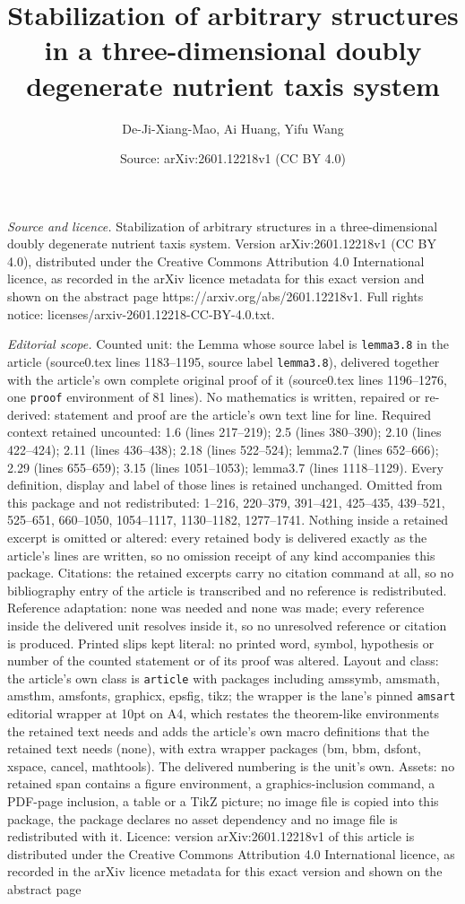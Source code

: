 \documentclass[10pt,a4paper]{amsart}
\title[Stabilization of arbitrary structures in a three-dimensional]{Stabilization of arbitrary structures in a three-dimensional doubly degenerate nutrient taxis system}
\author{De-Ji-Xiang-Mao, Ai Huang, Yifu Wang}
\date{Source: arXiv:2601.12218v1 (CC BY 4.0)}
\begin{document}
\maketitle

\noindent\emph{Source and licence.} Stabilization of arbitrary structures in a three-dimensional doubly degenerate nutrient taxis system. Version arXiv:2601.12218v1 (CC BY 4.0), distributed under the Creative Commons Attribution 4.0 International licence, as recorded in the arXiv licence metadata for this exact version and shown on the abstract page https://arxiv.org/abs/2601.12218v1. Full rights notice: licenses/arxiv-2601.12218-CC-BY-4.0.txt.\par\smallskip

\noindent\textit{Editorial scope.} Counted unit: the Lemma whose source label is \texttt{lemma3.8} in the article (source0.tex lines 1183--1195, source label \texttt{lemma3.8}), delivered together with the article's own complete original proof of it (source0.tex lines 1196--1276, one \texttt{proof} environment of 81 lines). No mathematics is written, repaired or re-derived: statement and proof are the article's own text line for line. Required context retained uncounted: 1.6 (lines 217--219); 2.5 (lines 380--390); 2.10 (lines 422--424); 2.11 (lines 436--438); 2.18 (lines 522--524); lemma2.7 (lines 652--666); 2.29 (lines 655--659); 3.15 (lines 1051--1053); lemma3.7 (lines 1118--1129). Every definition, display and label of those lines is retained unchanged. Omitted from this package and not redistributed: 1--216, 220--379, 391--421, 425--435, 439--521, 525--651, 660--1050, 1054--1117, 1130--1182, 1277--1741. Nothing inside a retained excerpt is omitted or altered: every retained body is delivered exactly as the article's lines are written, so no omission receipt of any kind accompanies this package. Citations: the retained excerpts carry no citation command at all, so no bibliography entry of the article is transcribed and no reference is redistributed. Reference adaptation: none was needed and none was made; every reference inside the delivered unit resolves inside it, so no unresolved reference or citation is produced. Printed slips kept literal: no printed word, symbol, hypothesis or number of the counted statement or of its proof was altered. Layout and class: the article's own class is \texttt{article} with packages including amssymb, amsmath, amsthm, amsfonts, graphicx, epsfig, tikz; the wrapper is the lane's pinned \texttt{amsart} editorial wrapper at 10pt on A4, which restates the theorem-like environments the retained text needs and adds the article's own macro definitions that the retained text needs (none), with extra wrapper packages (bm, bbm, dsfont, xspace, cancel, mathtools). The delivered numbering is the unit's own. Assets: no retained span contains a figure environment, a graphics-inclusion command, a PDF-page inclusion, a table or a TikZ picture; no image file is copied into this package, the package declares no asset dependency and no image file is redistributed with it. Licence: version arXiv:2601.12218v1 of this article is distributed under the Creative Commons Attribution 4.0 International licence, as recorded in the arXiv licence metadata for this exact version and shown on the abstract page 
\end{document}
